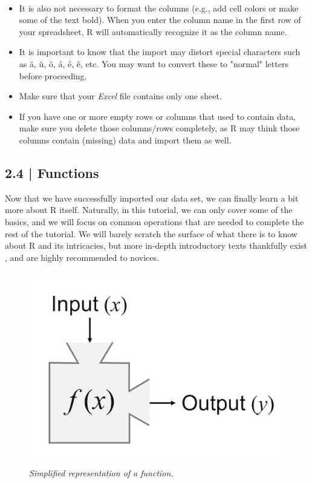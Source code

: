 \begin{box-info-continued} \\

\begin{itemize}
    \item It is also not necessary to format the columns (e.g., add cell colors or make some of the text bold). When you enter the column name in the first row of your spreadsheet, \textsf{R} will automatically recognize it as the column name.
    \item It is important to know that the import may distort special characters such as ä, ü, ö, á, é, ê, etc. You may want to convert these to "normal" letters before proceeding.
    \item Make sure that your \emph{Excel} file contains only one sheet.
    \item If you have one or more empty rows or columns that used to contain data, make sure you delete those columns/rows completely, as \textsf{R} may think those columns contain (missing) data and import them as well.
\end{itemize}
\end{box-info-continued}


\subsection{{\normalfont\textsf{\textcolor{sBlue}{\small 2.4 |}}} Functions}

Now that we have successfully imported our data set, we can finally learn a bit more about \textsf{R} itself. Naturally, in this tutorial, we can only cover some of the basics, and we will focus on common operations that are needed to complete the rest of the tutorial. We will barely scratch the surface of what there is to know about \textsf{R} and its intricacies, but more in-depth introductory texts thankfully exist \citep{navarro2013learning, wickham2016r}, and are highly recommended to novices. 

\begin{figure}
\vspace{-10mm}
\captionsetup{labelformat=empty}
\includegraphics[width=0.8\linewidth]{images/function.png} 
\caption{\emph{Simplified representation of a function.}}
\end{figure}

